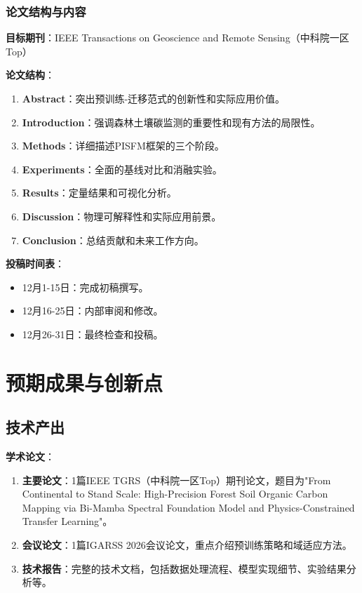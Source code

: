 \documentclass[12pt, a4paper]{article}
\begin{document}
\subsubsection{论文结构与内容}
\textbf{目标期刊}：IEEE Transactions on Geoscience and Remote Sensing（中科院一区Top）

\textbf{论文结构}：
\begin{enumerate}
    \item \textbf{Abstract}：突出预训练-迁移范式的创新性和实际应用价值。
    \item \textbf{Introduction}：强调森林土壤碳监测的重要性和现有方法的局限性。
    \item \textbf{Methods}：详细描述PISFM框架的三个阶段。
    \item \textbf{Experiments}：全面的基线对比和消融实验。
    \item \textbf{Results}：定量结果和可视化分析。
    \item \textbf{Discussion}：物理可解释性和实际应用前景。
    \item \textbf{Conclusion}：总结贡献和未来工作方向。
\end{enumerate}

\textbf{投稿时间表}：
\begin{itemize}
    \item 12月1-15日：完成初稿撰写。
    \item 12月16-25日：内部审阅和修改。
    \item 12月26-31日：最终检查和投稿。
\end{itemize}

\section{预期成果与创新点}

\subsection{技术产出}

\textbf{学术论文}：
\begin{enumerate}
    \item \textbf{主要论文}：1篇IEEE TGRS（中科院一区Top）期刊论文，题目为"From Continental to Stand Scale: High-Precision Forest Soil Organic Carbon Mapping via Bi-Mamba Spectral Foundation Model and Physics-Constrained Transfer Learning"。
    \item \textbf{会议论文}：1篇IGARSS 2026会议论文，重点介绍预训练策略和域适应方法。
    \item \textbf{技术报告}：完整的技术文档，包括数据处理流程、模型实现细节、实验结果分析等。
\end{enumerate}
\end{document}
